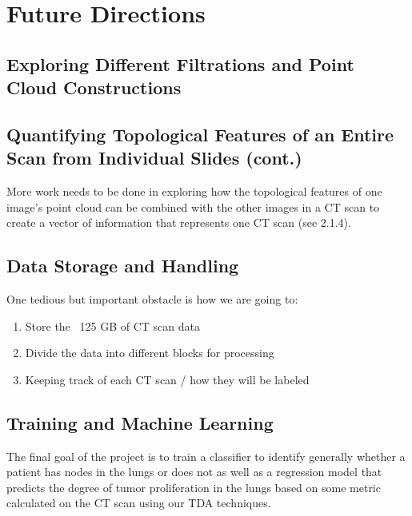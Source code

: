 \documentclass[12pt]{report}
\begin{document}
\section{Future Directions}

\subsection{Exploring Different Filtrations and Point Cloud Constructions}

\subsection{Quantifying Topological Features of an Entire Scan from Individual Slides (cont.)}

More work needs to be done in exploring how the topological features of one image's point cloud can be combined with the other images in a CT scan to create a vector of information that represents one CT scan (see 2.1.4).

\subsection{Data Storage and Handling}

One tedious but important obstacle is how we are going to:\newline

\begin{enumerate}
	\item Store the ~125 GB of CT scan data
	\item Divide the data into different blocks for processing
	\item Keeping track of each CT scan / how they will be labeled
\end{enumerate}

\subsection{Training and Machine Learning}

The final goal of the project is to train a classifier to identify generally whether a patient has nodes in the lungs or does not as well as a regression model that predicts the degree of tumor proliferation in the lungs based on some metric calculated on the CT scan using our TDA techniques.
\end{document}
